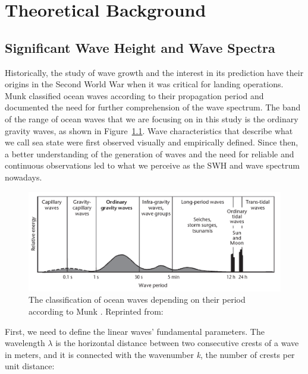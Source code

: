 
\chapter{Theoretical Background} %

\label{Chapter2} %


\section{Significant Wave Height and Wave Spectra}\label{swh_spectra}

Historically, the study of wave growth and the interest in its prediction have their origins in the Second World War when it was critical for landing operations. Munk \cite{Munk2010} classified ocean waves according to their propagation period and documented the need for further comprehension of the wave spectrum. The band of the range of ocean waves that we are focusing on in this study is the ordinary gravity waves, as shown in Figure~\ref{fig:ocean_waves}. Wave characteristics that describe what we call sea state were first observed visually and empirically defined. Since then, a better understanding of the generation of waves and the need for reliable and continuous observations led to what we perceive as the SWH and wave spectrum nowadays.


\begin{figure}[H]
\centering
\includegraphics[width=0.95\linewidth]{Figures/Chapter2/ocean_waves.png}
\caption{The classification of ocean waves depending on their period according to Munk \cite{Munk2010}. Reprinted from: \cite{Organization1998a}}
\label{fig:ocean_waves}
\end{figure}


First, we need to define the linear waves' fundamental parameters. The wavelength \emph{$\lambda$} is the horizontal distance between two consecutive crests of a wave in meters, and it is connected with the wavenumber \emph{k}, the number of crests per unit distance:


